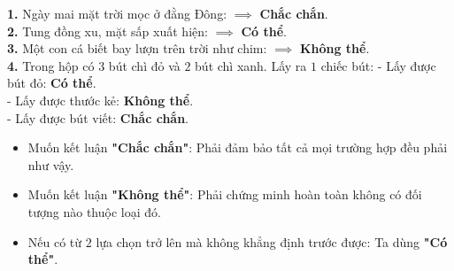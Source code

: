 \documentclass[10pt,a4paper]{article}
\begin{document}
\vspace{-1.5mm}
\noindent
\begin{minipage}[t]{0.49\textwidth}\vspace{0pt}
\begin{tcolorbox}[
  enhanced,
  colback=green!4!white,
  colframe=green!60!black,
  arc=2mm, boxrule=0.8pt,
  left=2mm, right=2mm, top=1.8mm, bottom=1.8mm,
  title={\footnotesize\bfseries\color{white}\faCheckCircle\ 4. Điền cụm từ thích hợp}
]
{\footnotesize
\textbf{1.} Ngày mai mặt trời mọc ở đằng Đông: $\implies$ \textbf{Chắc chắn}.\\
\textbf{2.} Tung đồng xu, mặt sấp xuất hiện: $\implies$ \textbf{Có thể}.\\
\textbf{3.} Một con cá biết bay lượn trên trời như chim: $\implies$ \textbf{Không thể}.\\
\textbf{4.} Trong hộp có $3$ bút chì đỏ và $2$ bút chì xanh. Lấy ra $1$ chiếc bút:
- Lấy được bút đỏ: \textbf{Có thể}.\\
- Lấy được thước kẻ: \textbf{Không thể}.\\
- Lấy được bút viết: \textbf{Chắc chắn}.
}
\end{tcolorbox}
\end{minipage}
\hfill
\begin{minipage}[t]{0.49\textwidth}\vspace{0pt}
\begin{tcolorbox}[
  enhanced,
  colback=rose!4!white,
  colframe=rose!70!black,
  arc=2mm, boxrule=0.8pt,
  left=2mm, right=2mm, top=1.8mm, bottom=1.8mm,
  title={\footnotesize\bfseries\color{white}\faExclamationTriangle\ 5. Mẹo suy luận đúng}
]
{\footnotesize
\begin{itemize}\setlength{\itemsep}{1.5pt}\setlength{\leftskip}{-2.5mm}
  \item Muốn kết luận \textbf{"Chắc chắn"}: Phải đảm bảo tất cả mọi trường hợp đều phải như vậy.
  \item Muốn kết luận \textbf{"Không thể"}: Phải chứng minh hoàn toàn không có đối tượng nào thuộc loại đó.
  \item Nếu có từ $2$ lựa chọn trở lên mà không khẳng định trước được: Ta dùng \textbf{"Có thể"}.
\end{itemize}
}
\end{tcolorbox}
\end{minipage}
\end{document}

